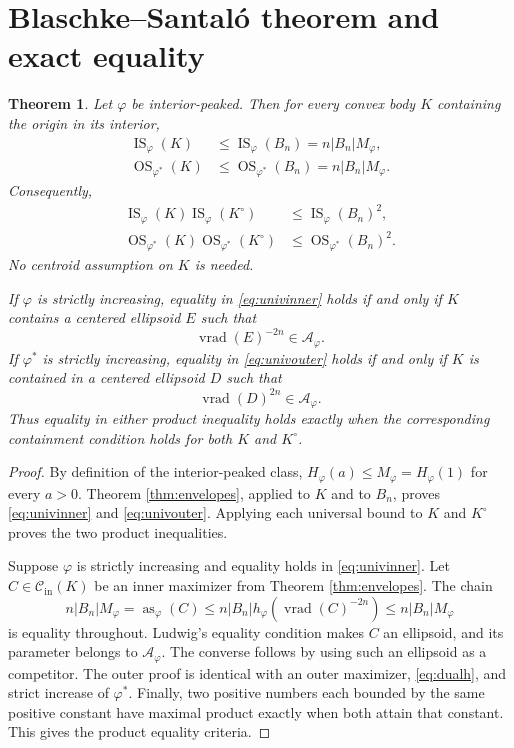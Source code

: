 \documentclass[11pt]{article}
\newtheorem{theorem}{Theorem}
\newcommand{\as}{\operatorname{as}}
\newcommand{\IS}{\operatorname{IS}}
\newcommand{\OS}{\operatorname{OS}}
\newcommand{\vrad}{\operatorname{vrad}}
\newcommand{\Cin}{\mathcal C_{\mathrm{in}}}
\begin{document}
\section{Blaschke--Santal\'o theorem and exact equality}

\begin{theorem}\label{thm:full}
Let $\varphi$ be interior-peaked.  Then for every convex body $K$ containing
the origin in its interior,
\begin{align}
 \IS_\varphi(K)&\leq\IS_\varphi(B_n)=n|B_n|M_\varphi,
 \label{eq:univinner}\\
 \OS_{\varphi^*}(K)&\leq\OS_{\varphi^*}(B_n)=n|B_n|M_\varphi.
 \label{eq:univouter}
\end{align}
Consequently,
\begin{align}
 \IS_\varphi(K)\IS_\varphi(K^\circ)&\leq\IS_\varphi(B_n)^2,
 \label{eq:BSinner}\\
 \OS_{\varphi^*}(K)\OS_{\varphi^*}(K^\circ)
 &\leq\OS_{\varphi^*}(B_n)^2.
 \label{eq:BSouter}
\end{align}
No centroid assumption on $K$ is needed.

If $\varphi$ is strictly increasing, equality in \eqref{eq:univinner} holds
if and only if $K$ contains a centered ellipsoid $E$ such that
\begin{equation}\label{eq:innereq}
 \vrad(E)^{-2n}\in\mathcal A_\varphi.
\end{equation}
If $\varphi^*$ is strictly increasing, equality in \eqref{eq:univouter}
holds if and only if $K$ is contained in a centered ellipsoid $D$ such that
\begin{equation}\label{eq:outereq}
 \vrad(D)^{2n}\in\mathcal A_\varphi.
\end{equation}
Thus equality in either product inequality holds exactly when the
corresponding containment condition holds for both $K$ and $K^\circ$.
\end{theorem}

\begin{proof}
By definition of the interior-peaked class,
$H_\varphi(a)\leq M_\varphi=H_\varphi(1)$ for every $a>0$.  Theorem
\ref{thm:envelopes}, applied to $K$ and to $B_n$, proves
\eqref{eq:univinner} and \eqref{eq:univouter}.  Applying each universal bound
to $K$ and $K^\circ$ proves the two product inequalities.

Suppose $\varphi$ is strictly increasing and equality holds in
\eqref{eq:univinner}.  Let $C\in\Cin(K)$ be an inner maximizer from Theorem
\ref{thm:envelopes}.  The chain
\[
 n|B_n|M_\varphi=\as_\varphi(C)
 \leq n|B_n|h_\varphi(\vrad(C)^{-2n})
 \leq n|B_n|M_\varphi
\]
is equality throughout.  Ludwig's equality condition makes $C$ an ellipsoid,
and its parameter belongs to $\mathcal A_\varphi$.  The converse follows by
using such an ellipsoid as a competitor.  The outer proof is identical with
an outer maximizer, \eqref{eq:dualh}, and strict increase of $\varphi^*$.
Finally, two positive numbers each bounded by the same positive constant have
maximal product exactly when both attain that constant.  This gives the
product equality criteria.
\end{proof}
\end{document}
